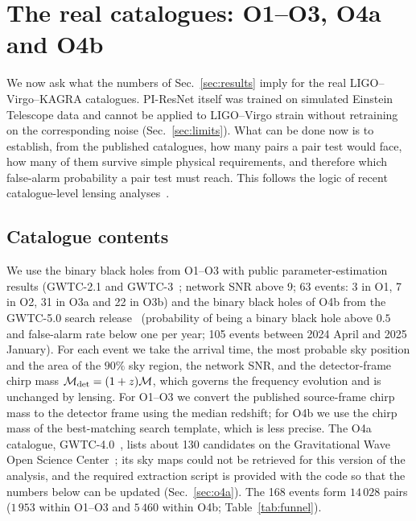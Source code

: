 \documentclass[aps,prd,twocolumn,superscriptaddress,nofootinbib,floatfix]{revtex4-2}
\newcommand{\PIR}{PI-ResNet}
\begin{document}
\section{The real catalogues: O1--O3, O4a and O4b}
\label{sec:catalogue}

We now ask what the numbers of Sec.~\ref{sec:results} imply for the real LIGO--Virgo--KAGRA catalogues.
\PIR{} itself was trained on simulated Einstein Telescope data and cannot be applied to LIGO--Virgo strain without retraining on the corresponding noise (Sec.~\ref{sec:limits}).
What can be done now is to establish, from the published catalogues, how many pairs a pair test would face, how many of them survive simple physical requirements, and therefore which false-alarm probability a pair test must reach.
This follows the logic of recent catalogue-level lensing analyses~\cite{Campailla,Caliskan2023}.

\subsection{Catalogue contents}

We use the binary black holes from O1--O3 with public parameter-estimation results (GWTC-2.1 and GWTC-3~\cite{GWTC21,GWTC3}; network SNR above 9; 63 events: 3 in O1, 7 in O2, 31 in O3a and 22 in O3b) and the binary black holes of O4b from the GWTC-5.0 search release~\cite{GWTC5} (probability of being a binary black hole above $0.5$ and false-alarm rate below one per year; 105 events between 2024 April and 2025 January).
For each event we take the arrival time, the most probable sky position and the area of the $90\%$ sky region, the network SNR, and the detector-frame chirp mass $\mathcal M_{\rm det}=(1+z)\mathcal M$, which governs the frequency evolution and is unchanged by lensing.
For O1--O3 we convert the published source-frame chirp mass to the detector frame using the median redshift; for O4b we use the chirp mass of the best-matching search template, which is less precise.
The O4a catalogue, GWTC-4.0~\cite{GWTC4}, lists about 130 candidates on the Gravitational Wave Open Science Center~\cite{GWOSC_O3}; its sky maps could not be retrieved for this version of the analysis, and the required extraction script is provided with the code so that the numbers below can be updated (Sec.~\ref{sec:o4a}).
The 168 events form $14\,028$ pairs ($1\,953$ within O1--O3 and $5\,460$ within O4b; Table~\ref{tab:funnel}).
\end{document}
